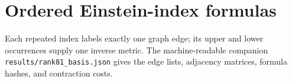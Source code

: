 \documentclass[11pt]{article}
\begin{document}
\clearpage\appendix
\section{Ordered Einstein-index formulas}
Each repeated index labels exactly one graph edge; its upper and lower
occurrences supply one inverse metric. The machine-readable companion
\texttt{results/rank81\_basis.json} gives the edge lists, adjacency matrices,
formula hashes, and contraction costs.
\small

\end{document}
